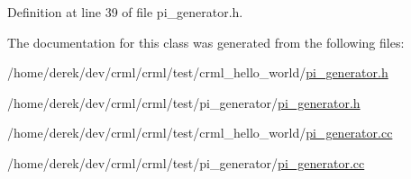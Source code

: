Definition at line 39 of file pi\_\-generator.h.



The documentation for this class was generated from the following files:\begin{DoxyCompactItemize}
\item 
/home/derek/dev/crml/crml/test/crml\_\-hello\_\-world/\hyperlink{crml__hello__world_2pi__generator_8h}{pi\_\-generator.h}\item 
/home/derek/dev/crml/crml/test/pi\_\-generator/\hyperlink{pi__generator_2pi__generator_8h}{pi\_\-generator.h}\item 
/home/derek/dev/crml/crml/test/crml\_\-hello\_\-world/\hyperlink{crml__hello__world_2pi__generator_8cc}{pi\_\-generator.cc}\item 
/home/derek/dev/crml/crml/test/pi\_\-generator/\hyperlink{pi__generator_2pi__generator_8cc}{pi\_\-generator.cc}\end{DoxyCompactItemize}
